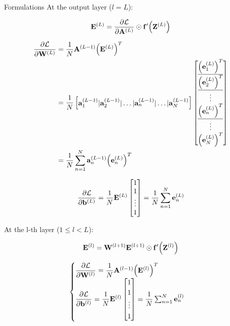 \documentclass[10pt]{beamer}
\theoremstyle{remark}
\theoremstyle{definition}
\begin{document}
\begin{frame}[allowframebreaks]{Formulations}
	At the output layer ($l=L$):

	\begin{equation}
		\bold{E}^{(L)}=\dfrac{\partial \mathcal{L}}{\partial \bold{A}^{(L)}} \odot \bold{f}^{\prime}\Big( \bold{Z}^{(L)} \Big)
	\end{equation}

	\begin{equation}
		\begin{aligned}
			\dfrac{\partial \mathcal{L}}{\partial \bold{W}^{(L)}}&=\dfrac{1}{N}\bold{A}^{(L-1)} \Big(\bold{E}^{(L)}\Big)^T\\&=\dfrac{1}{N}\begin{bmatrix} \bold{a}_1^{(L-1)} \vert \bold{a}_2^{(L-1)} \vert \dots \vert \bold{a}_n^{(L-1)} \vert \dots \vert \bold{a}_N^{(L-1)} \end{bmatrix}\begin{bmatrix} \underline{\Big(\bold{e}_1^{(L)}\Big)^T} \\ \underline{\Big(\bold{e}_2^{(L)}\Big)^T} \\ \vdots \\ \underline{\Big(\bold{e}_n^{(L)}\Big)^T} \\ \vdots \\ \Big(\bold{e}_N^{(L)}\Big)^T \end{bmatrix}\\&=\dfrac{1}{N}\sum_{n=1}^{N} \bold{a}_n^{(L-1)}\Big(\bold{e}_n^{(L)}\Big)^T
		\end{aligned}
	\end{equation}

	\begin{equation}
		\dfrac{\partial \mathcal{L}}{\partial \bold{b}^{(L)}}=\dfrac{1}{N}\bold{E}^{(L)}\begin{bmatrix} 1 \\ 1 \\ \vdots \\ 1 \end{bmatrix}=\dfrac{1}{N}\sum_{n=1}^{N}\bold{e}_n^{(L)}
	\end{equation}

	At the l-th layer ($1 \leq l < L$):

	\begin{equation}
		\bold{E}^{(l)}=\bold{W}^{(l+1)}\bold{E}^{(l+1)}\odot \bold{f}^{\prime}\Big( \bold{Z}^{(l)} \Big)
	\end{equation}

	\begin{equation}
		\begin{cases}\dfrac{\partial \mathcal{L}}{\partial \bold{W}^{(l)}}=\dfrac{1}{N}\bold{A}^{(l-1)}\Big(\bold{E}^{(l)}\Big)^T \\ \dfrac{\partial \mathcal{L}}{\partial \bold{b}^{(l)}}=\dfrac{1}{N}\bold{E}^{(l)}\begin{bmatrix} 1 \\ 1 \\ \vdots \\ 1 \end{bmatrix}=\dfrac{1}{N}\sum_{n=1}^{N}\bold{e}_n^{(l)} \end{cases}
	\end{equation}


\end{frame}
\end{document}
